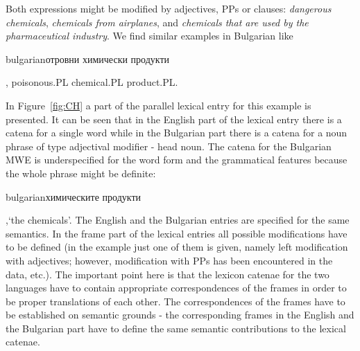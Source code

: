 \documentclass[output=paper]{langsci/langscibook}
\begin{document}
Both expressions might be modified by adjectives, PPs or clauses:
\textit{dangerous chemicals}, \textit{chemicals from airplanes}, and \textit{chemicals that
are used by the pharmaceutical industry}. We find similar examples in
Bulgarian like \begin{otherlanguage*}{bulgarian}отровни химически
продукти\end{otherlanguage*}, poisonous.\textsc{PL} chemical.\textsc{PL} product.\textsc{PL}.

In Figure~\ref{fig:CH} a part of the parallel lexical entry for this example
is presented. It can be seen that in the English part of the lexical entry
there is a catena for a single word while in the Bulgarian part there is a
catena for a noun phrase of type adjectival modifier - head noun. The catena
for the Bulgarian MWE is underspecified for the word form and the
grammatical features because the whole phrase might be definite:
\begin{otherlanguage*}{bulgarian}химическите
продукти\end{otherlanguage*},`the chemicals'. The English
and the Bulgarian entries are specified for the same semantics. In the frame
part of the lexical entries all possible modifications have to be defined
(in the example just one of them is given, namely left modification with
adjectives; however, modification with PPs has been encountered in the data,
etc.). The important point here is that the lexicon catenae for the two
languages have to contain appropriate correspondences of the frames in order
to be proper translations of each other. The correspondences of the
frames have to be established on semantic grounds -  the corresponding
frames in the English and the Bulgarian part have to define the same
semantic contributions to the lexical catenae.
\end{document}
